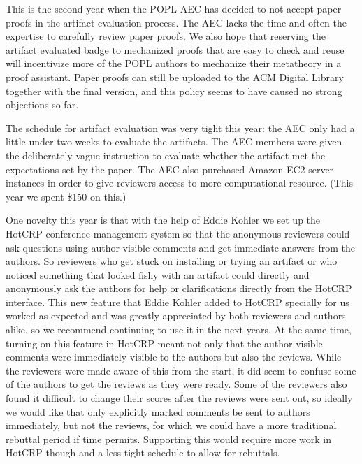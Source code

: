 This is the second year when the POPL AEC has decided to not accept paper proofs
in the artifact evaluation process. The AEC lacks the time and often the
expertise to carefully review paper proofs. We also hope that reserving the
artifact evaluated badge to mechanized proofs that are easy to check and reuse
will incentivize more of the POPL authors to mechanize their metatheory in a
proof assistant. Paper proofs can still be uploaded to the ACM Digital Library
together with the final version, and this policy seems to have caused no strong
objections so far.

The schedule for artifact evaluation was very tight this year: the AEC only had
a little under two weeks to evaluate the artifacts. The AEC members were given
the deliberately vague instruction to evaluate whether the artifact met the
expectations set by the paper. The AEC also purchased Amazon EC2 server
instances in order to give reviewers access to more computational resource.
(This year we spent \$150 on this.)

One novelty this year is that with the help of Eddie Kohler we set up the HotCRP
conference management system so that the anonymous reviewers could ask questions
using author-visible comments and get immediate answers from the authors. So
reviewers who get stuck on installing or trying an artifact or who noticed
something that looked fishy with an artifact could directly and anonymously ask
the authors for help or clarifications directly from the HotCRP interface. This
new feature that Eddie Kohler added to HotCRP specially for us worked as
expected and was greatly appreciated by both reviewers and authors alike, so we
recommend continuing to use it in the next years. At the same time, turning on
this feature in HotCRP meant not only that the author-visible comments were
immediately visible to the authors but also the reviews. While the reviewers
were made aware of this from the start, it did seem to confuse some of the
authors to get the reviews as they were ready. Some of the reviewers also found
it difficult to change their scores after the reviews were sent out, so ideally
we would like that only explicitly marked comments be sent to authors
immediately, but not the reviews, for which we could have a more traditional
rebuttal period if time permits. Supporting this would require more work in
HotCRP though and a less tight schedule to allow for rebuttals.


